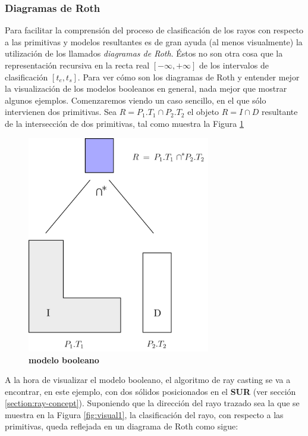 \subsubsection{Diagramas de Roth}
Para facilitar la comprensión del proceso de clasificación de los rayos con respecto a las primitivas y modelos resultantes es de gran ayuda (al menos visualmente) la utilización de los llamados \textit{diagramas de Roth}. Éstos no son otra cosa que la representación recursiva en la recta real $[−\infty, +\infty]$ de los intervalos de clasificación $[t_e, t_s]$.
Para ver cómo son los diagramas de Roth y entender mejor la visualización de los modelos booleanos en general, nada mejor que mostrar algunos ejemplos. Comenzaremos viendo un caso sencillo, en el que sólo intervienen dos primitivas.
Sea $R = P_1.T_1 \cap P_2.T_2$ el objeto $R = I \cap D$ resultante de la intersección de dos primitivas, tal como muestra la Figura \ref{fig:visual0}

\begin{figure}[h]
\includegraphics[width=8cm]{Img/GEO/ray0.png}
\centering
\caption{\textbf{\footnotesize{modelo booleano}}}
\label{fig:visual0}
\end{figure}

A la hora de visualizar el modelo booleano, el algoritmo de ray casting se va a encontrar, en este ejemplo, con dos sólidos posicionados en el \textbf{SUR} (ver sección \ref{section:ray-concept}). Suponiendo que la dirección del rayo trazado sea la que se muestra en la Figura \ref{fig:visual1}, la clasificación del rayo, con respecto a las primitivas, queda reflejada en un diagrama de Roth como sigue:


